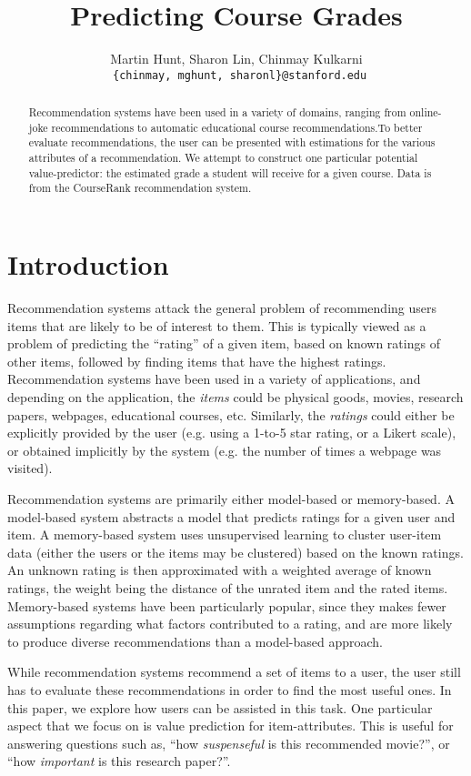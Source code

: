 \documentclass{article} %
\title{Predicting Course Grades}
\author{
Martin Hunt, Sharon Lin, Chinmay Kulkarni \\
\texttt{ \{chinmay, mghunt, sharonl\}@stanford.edu}
}
\begin{document}
\maketitle

\begin{abstract}
Recommendation systems have been used in a variety of domains, ranging from online-joke recommendations to automatic educational course recommendations.To better evaluate recommendations, the user can be presented with estimations for the various attributes of a recommendation. We attempt to construct one particular potential value-predictor: the estimated grade a student will receive for a given course. Data is from the CourseRank recommendation system.
\end{abstract}

\section{Introduction}
\label{sec:intro}
Recommendation systems attack the general problem of recommending users items that are likely to be of interest to them. This is typically viewed as a problem of predicting the ``rating'' of a given item, based on known ratings of other items, followed by finding items that have the highest ratings. Recommendation systems have been used in a variety of applications, and depending on the application, the \textit{items} could be physical goods, movies, research papers, webpages, educational courses, etc. Similarly, the \textit{ratings} could either be explicitly provided by the user (e.g. using a 1-to-5 star rating, or a Likert scale), or obtained implicitly by the system (e.g. the number of times a webpage was visited).

Recommendation systems are primarily either model-based or memory-based. A model-based system abstracts a model that predicts ratings for a given user and item. A memory-based system uses unsupervised learning to cluster user-item data (either the users or the items may be clustered) based on the known ratings. An unknown rating is then approximated with a weighted average of known ratings, the weight being the distance of the unrated item and the rated items. Memory-based systems have been particularly popular, since they makes fewer assumptions regarding what factors contributed to a rating, and are more likely to produce diverse recommendations than a model-based approach. 

While recommendation systems recommend a set of items to a user, the user still has to evaluate these recommendations in order to find the most useful ones. In this paper, we explore how users can be assisted in this task. One particular aspect that we focus on is value prediction for item-attributes. This is useful for answering questions such as, ``how \textit{suspenseful} is this recommended movie?'', or ``how \textit{important} is this research paper?''. 
\end{document}
